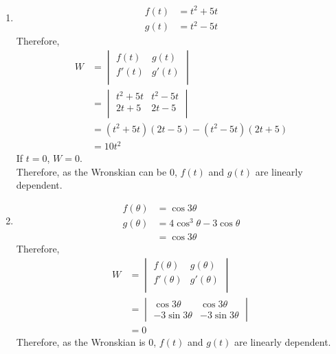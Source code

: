 \documentclass[fleqn, a4paper, 11pt, oneside]{amsart}
\theoremstyle{definition}
\theoremstyle{theorem}
\begin{document}
\begin{solution}
	\begin{enumerate}[leftmargin = *]
		\item
			\begin{align*}
				f(t) & = t^2 + 5 t \\
				g(t) & = t^2 - 5 t
			\end{align*}
			Therefore,
			\begin{align*}
				W &=
					\begin{vmatrix}
						f(t)  & g(t)  \\
						f'(t) & g'(t) \\
					\end{vmatrix}\\
				  &=
					\begin{vmatrix}
						t^2 + 5 t & t^2 - 5 t \\
						2 t + 5   & 2 t - 5   \\
					\end{vmatrix}\\
				  &= \left( t^2 + 5 t \right) \left( 2 t - 5 \right) - \left( t^2 - 5 t \right) \left( 2 t + 5 \right)\\
				  &= 10 t^2
			\end{align*}
			If $t = 0$, $W = 0$.\\
			Therefore, as the Wronskian can be $0$, $f(t)$ and $g(t)$ are linearly dependent.
		\item
			\begin{align*}
				f(\theta) & = \cos 3 \theta                   \\
				g(\theta) & = 4 \cos^3 \theta - 3 \cos \theta \\
                                          & = \cos 3 \theta
			\end{align*}
			Therefore,
			\begin{align*}
				W &=
					\begin{vmatrix}
						f(\theta)  & g(\theta)  \\
						f'(\theta) & g'(\theta) \\
					\end{vmatrix}\\
				  &=
					\begin{vmatrix}
						\cos 3 \theta    & \cos 3 \theta \\
						-3 \sin 3 \theta & - 3 \sin 3 \theta
					\end{vmatrix}\\
				  &= 0
			\end{align*}
			Therefore, as the Wronskian is $0$, $f(t)$ and $g(t)$ are linearly dependent.

\end{enumerate}
\end{solution}
\end{document}
